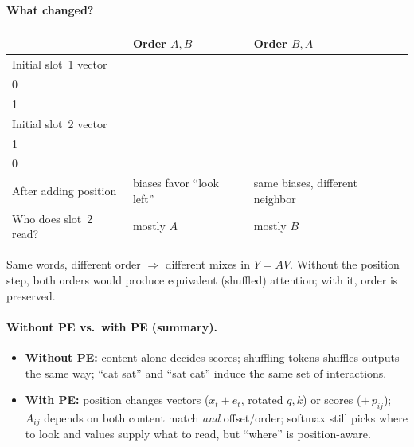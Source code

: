 \documentclass[11pt]{article}
\begin{document}
\paragraph{What changed?}
\begin{center}
\begin{tabular}{@{}lll@{}}
\toprule
 & Order \(A,B\) & Order \(B,A\) \\
\midrule
Initial slot~1 vector
  & \(x_A=\begin{bmatrix}1\\0\end{bmatrix}\)
  & \(x_B=\begin{bmatrix}0\\1\end{bmatrix}\) \\[0.9em]
Initial slot~2 vector
  & \(x_B=\begin{bmatrix}0\\1\end{bmatrix}\)
  & \(x_A=\begin{bmatrix}1\\0\end{bmatrix}\) \\[0.9em]
After adding position
  & biases favor ``look left''
  & same biases, different neighbor \\
Who does slot~2 read?
  & mostly \(A\)
  & mostly \(B\) \\
\bottomrule
\end{tabular}
\end{center}
Same words, different order \(\Rightarrow\) different mixes in \(Y=AV\).
Without the position step, both orders would produce equivalent
(shuffled) attention; with it, order is preserved.

\paragraph{Without PE vs.\ with PE (summary).}
\begin{itemize}[leftmargin=*]
  \item \textbf{Without PE:} content alone decides scores; shuffling tokens
        shuffles outputs the same way; ``cat sat'' and ``sat cat'' induce
        the same set of interactions.
  \item \textbf{With PE:} position changes vectors (\(x_t+e_t\), rotated
        \(q,k\)) or scores (\(+\,p_{ij}\)); \(A_{ij}\) depends on both
        content match \emph{and} offset/order; softmax still picks where to
        look and values supply what to read, but ``where'' is
        position-aware.
\end{itemize}
\end{document}
